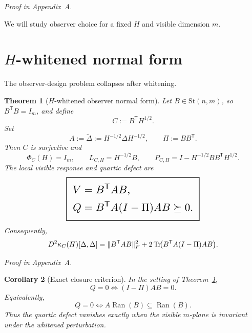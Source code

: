 \documentclass[11pt,a4paper]{article}
\numberwithin{equation}{section}
\DeclareMathOperator{\Tr}{Tr}
\DeclareMathOperator{\Ran}{Ran}
\DeclarePairedDelimiter{\norm}{\lVert}{\rVert}
\newcommand{\St}{\mathrm{St}}
\newcommand{\geomboxed}[1]{%
  \setlength{\fboxsep}{8pt}%
  \setlength{\fboxrule}{0.9pt}%
  \fbox{\scalebox{1.5}{$\displaystyle #1$}}%
}
\theoremstyle{thmcompact}
\newtheorem{theorem}{Theorem}[section]
\newtheorem{corollary}[theorem]{Corollary}
\theoremstyle{remark}
\newcommand{\proofappendix}{\par{\hfill\scriptsize\emph{Proof in Appendix~A.}}\par}
\begin{document}
\proofappendix

We will study observer choice for a fixed $H$ and visible dimension $m$.

\section{$H$-whitened normal form}

The observer-design problem collapses after whitening.

\begin{theorem}[$H$-whitened observer normal form]
\label{thm:whitened-normal-form}
Let $B\in\St(n,m)$, so $B^{\mathsf T}B=I_m$, and define
\begin{equation}
C:=B^{\mathsf T}H^{1/2}.
\label{eq:C-from-B}
\end{equation}
Set
\begin{equation}
A:=\widetilde\Delta:=H^{-1/2}\Delta H^{-1/2},
\qquad
\Pi:=BB^{\mathsf T}.
\label{eq:Delta-tilde}
\end{equation}
Then $C$ is surjective and
\begin{equation}
\Phi_C(H)=I_m,
\qquad
L_{C,H}=H^{-1/2}B,
\qquad
P_{C,H}=I-H^{-1/2}BB^{\mathsf T}H^{1/2}.
\label{eq:normal-form-basic}
\end{equation}
The local visible response and quartic defect are
\begin{equation}
\label{eq:normal-form-VQ}
\geomboxed{\begin{aligned}
V&=B^{\mathsf T}AB,\\
Q&=B^{\mathsf T}A(I-\Pi)AB\succeq 0.
\end{aligned}}
\end{equation}
Consequently,
\begin{equation}
D^2\kappa_C(H)[\Delta,\Delta]
=
\norm{B^{\mathsf T}AB}_F^2
+
2\Tr\!\bigl(B^{\mathsf T}A(I-\Pi)AB\bigr).
\label{eq:det-split-whitened}
\end{equation}
\end{theorem}

\proofappendix

\begin{corollary}[Exact closure criterion]
\label{cor:closure-criterion}
In the setting of Theorem~\ref{thm:whitened-normal-form},
\begin{equation}
Q=0
\iff
(I-\Pi)AB=0.
\label{eq:closure-criterion}
\end{equation}
Equivalently,
\begin{equation}
Q=0
\iff
A\Ran(B)\subseteq \Ran(B).
\label{eq:invariant-subspace-criterion}
\end{equation}
Thus the quartic defect vanishes exactly when the visible $m$-plane is invariant under the whitened perturbation.
\end{corollary}
\end{document}
